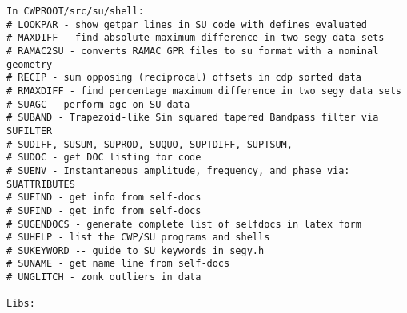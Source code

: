 {{\begin{verbatim}
In CWPROOT/src/su/shell:
# LOOKPAR - show getpar lines in SU code with defines evaluated
# MAXDIFF - find absolute maximum difference in two segy data sets
# RAMAC2SU - converts RAMAC GPR files to su format with a nominal geometry
# RECIP - sum opposing (reciprocal) offsets in cdp sorted data
# RMAXDIFF - find percentage maximum difference in two segy data sets
# SUAGC - perform agc on SU data 
# SUBAND - Trapezoid-like Sin squared tapered Bandpass filter via  SUFILTER
# SUDIFF, SUSUM, SUPROD, SUQUO, SUPTDIFF, SUPTSUM,
# SUDOC - get DOC listing for code
# SUENV - Instantaneous amplitude, frequency, and phase via: SUATTRIBUTES
# SUFIND - get info from self-docs
# SUFIND - get info from self-docs
# SUGENDOCS - generate complete list of selfdocs in latex form
# SUHELP - list the CWP/SU programs and shells
# SUKEYWORD -- guide to SU keywords in segy.h
# SUNAME - get name line from self-docs
# UNGLITCH - zonk outliers in data

Libs: 


\end{verbatim}}}
